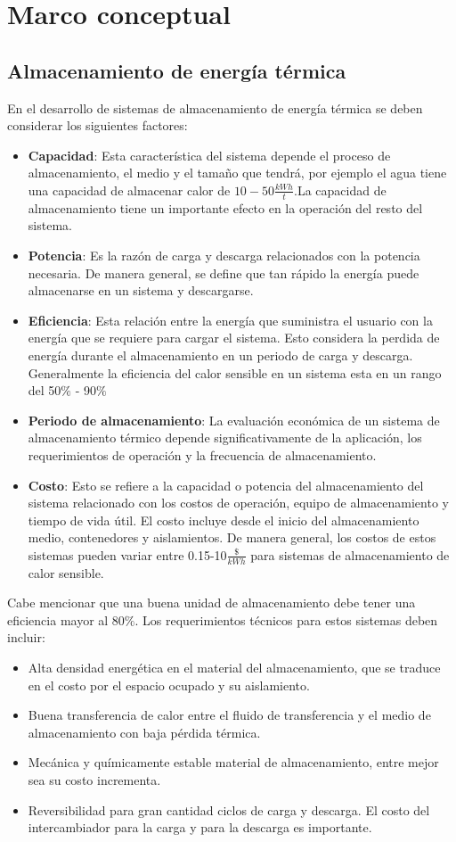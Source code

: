 
\chapter{Marco conceptual}

\section{Almacenamiento de energ\'ia t\'ermica}
En el desarrollo de sistemas de almacenamiento de energ\'ia t\'ermica se deben considerar los siguientes factores:
\begin{itemize}
	\item \textbf{Capacidad}: Esta característica del sistema depende el proceso de almacenamiento, el medio y el tama\~no que tendrá, por ejemplo el agua tiene una capacidad de almacenar calor de $10-50 \frac{kWh}{t}$.La capacidad de almacenamiento tiene un importante efecto en la operación del resto del sistema.
	\item \textbf{Potencia}: Es la raz\'on de carga y descarga relacionados con la potencia necesaria. De manera general, se define que tan r\'apido la energ\'ia puede almacenarse en un sistema y descargarse.
	\item \textbf{Eficiencia}: Esta relaci\'on entre la energ\'ia que suministra el usuario con la energ\'ia que se requiere para cargar el sistema. Esto considera la perdida de energ\'ia durante el almacenamiento en un periodo de carga y descarga. Generalmente la eficiencia del calor sensible en un sistema esta en un rango del 50$\%$ - 90$\%$
	\item \textbf{Periodo de almacenamiento}: La evaluaci\'on económica de un sistema de almacenamiento t\'ermico depende significativamente de la aplicaci\'on, los requerimientos de operaci\'on y la frecuencia de almacenamiento.
	\item \textbf{Costo}: Esto se refiere a la capacidad o potencia del almacenamiento del sistema relacionado con los costos de operaci\'on, equipo de almacenamiento y tiempo de vida \'util. El costo incluye desde el inicio del almacenamiento medio, contenedores y aislamientos. De manera general, los costos de estos sistemas pueden variar entre 0.15-10$\frac{\$}{kWh}$ para sistemas de almacenamiento de calor sensible.
\end{itemize}
Cabe mencionar que una buena unidad de almacenamiento debe tener una eficiencia mayor al 80$\%$. Los requerimientos t\'ecnicos para estos sistemas deben incluir:
\begin{itemize}
	\item Alta densidad energ\'etica en el material del almacenamiento, que se traduce en el costo por el espacio ocupado y su aislamiento.
	\item Buena transferencia de calor entre el fluido de transferencia y el medio de almacenamiento con baja p\'erdida t\'ermica.
	\item Mec\'anica y qu\'imicamente estable material de almacenamiento, entre mejor sea su costo incrementa.
	\item Reversibilidad para gran cantidad ciclos de carga y descarga. El costo del intercambiador para la carga y para la descarga es importante\cite{Yatish2017}.
\end{itemize}

